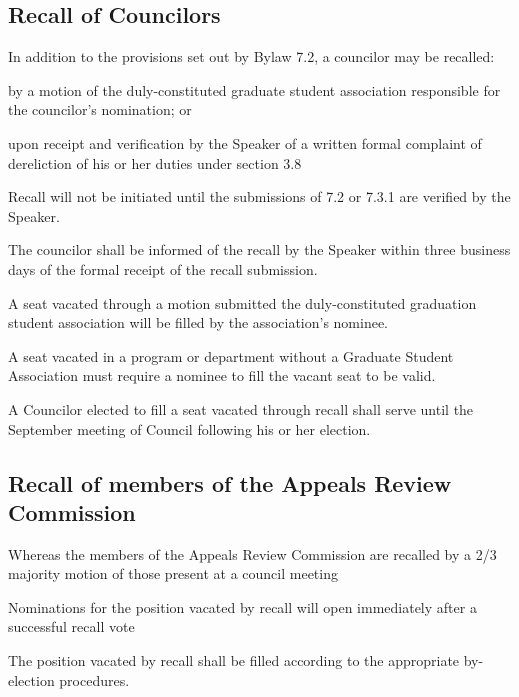 \subsection {Recall of Councilors}
\begin{longenum}[ label*=\thesubsection.\arabic*., align=left]
	\item In addition to the provisions set out by Bylaw 7.2, a councilor may be recalled:
    \begin{longenum}[ label*=\arabic*., align=left]
		\item by a motion of the duly-constituted graduate student association responsible for the councilor's nomination; or
        \item upon receipt and verification by the Speaker of a written formal complaint of dereliction of his or her duties under section 3.8
	\end{longenum}
    \item Recall will not be initiated until the submissions of 7.2 or 7.3.1 are verified by the Speaker.
    \item The councilor shall be informed of the recall by the Speaker within three business days of the formal receipt of the recall submission.
    \item A seat vacated through a motion submitted the duly-constituted graduation student association will be filled by the association's nominee.
    \item A seat vacated in a program or department without a Graduate Student Association must require a nominee to fill the vacant seat to be valid. 
    \item A Councilor elected to fill a seat vacated through recall shall serve until the September meeting of Council following his or her election.
\end{longenum}

\subsection{Recall of members of the Appeals Review Commission}
\begin{longenum}[ label*=\thesubsection.\arabic*., align=left]
	\item Whereas the members of the Appeals Review Commission are recalled by a 2/3 majority motion of those present at a council meeting
    \item Nominations for the position vacated by recall will open immediately after a successful recall vote
    \item The position vacated by recall shall be filled according to the appropriate by-election procedures.
\end{longenum}

